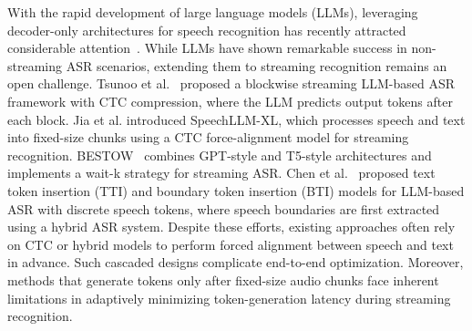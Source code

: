 \documentclass{article}
\begin{document}
With the rapid development of large language models (LLMs), leveraging decoder-only architectures for speech recognition has recently attracted considerable attention~\cite{10.5555/3692070.3693991, 10447553, wang-etal-2024-exploring, fathullah2024prompting}. While LLMs have shown remarkable success in non-streaming ASR scenarios, extending them to streaming recognition remains an open challenge. Tsunoo et al.~\cite{tsunoo24_interspeech} proposed a blockwise streaming LLM-based ASR framework with CTC compression, where the LLM predicts output tokens after each block. Jia et al.\cite{10890853} introduced SpeechLLM-XL, which processes speech and text into fixed-size chunks using a CTC force-alignment model for streaming recognition. BESTOW~\cite{10832146} combines GPT-style and T5-style architectures and implements a wait-k strategy for streaming ASR. Chen et al.~\cite{chen24u_interspeech} proposed text token insertion (TTI) and boundary token insertion (BTI) models for LLM-based ASR with discrete speech tokens, where speech boundaries are first extracted using a hybrid ASR system.
Despite these efforts, existing approaches often rely on CTC or hybrid models to perform forced alignment between speech and text in advance. Such cascaded designs complicate end-to-end optimization. Moreover, methods that generate tokens only after fixed-size audio chunks face inherent limitations in adaptively minimizing token-generation latency during streaming recognition.
\end{document}
